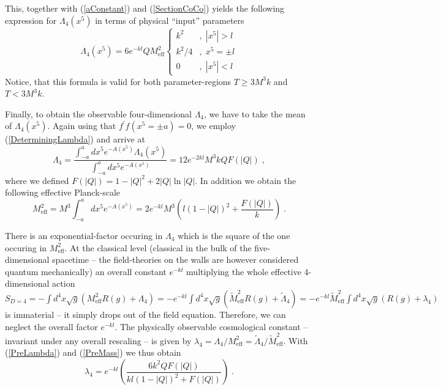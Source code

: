 \documentclass[a4paper,12pt]{article}
\begin{document}
This, together with (\ref{aConstant}) and (\ref{SectionCoCo}) yields
the following expression for $\Lambda_4(x^5)$ in terms of physical
``input'' parameters
\begin{equation}
     \Lambda_4(x^5)
   =  6 e^{-kl} Q M^2_{\text{eff}}
     \left\{ \begin{array}{cc}
                k^2     &,\; |x^5| > l \\
                k^2/4   &,\; x^5 = \pm l \\
                   0        &,\; |x^5| < l
             \end{array}
     \right.
    \label{SectionCoCoFinal}
\end{equation}
Notice, that this formula is valid for both parameter-regions $T \ge 3M^3 k$
and $T < 3M^3 k$.

Finally, to obtain the observable four-dimensional $\Lambda_4$, we
have to take the mean of $\Lambda_4(x^5)$. Again using that $f^\prime
f(x^5=\pm a)=0$, we employ (\ref{DeterminingLambda}) and arrive at
\begin{equation}
  \Lambda_4 = \frac{\int_{-a}^a dx^5 e^{-A(x^5)}\Lambda_4(x^5)}
                    {\int_{-a}^a dx^5 e^{-A(x^5)}}
            = 12e^{-2kl}M^3 k Q F(|Q|) \; ,
  \label{PreLambda}
\end{equation}
where we defined $F(|Q|)=1-|Q|^2+2|Q|\ln|Q|$. In addition we obtain
the following effective Planck-scale
\begin{equation}
  M_{\text{eff}}^2 = M^3 \int_{-a}^a dx^5 e^{-A(x^5)}
                   = 2e^{-kl}M^3\left(l(1-|Q|)^2+\frac{F(|Q|)}{k}\right) 
                      \; .
  \label{PreMass}
\end{equation}

There is an exponential-factor occuring in $\Lambda_4$ which is the
square of the one occuring in $M_{\text{eff}}^2$. At the classical
level (classical in the bulk of the five-dimensional spacetime -- the
field-theories on the walls are however considered quantum
mechanically) an overall constant $e^{-kl}$ multiplying the whole
effective 4-dimensional action $S_{D=4}= -\int
d^4x\sqrt{g}(M^2_{\text{eff}}R(g)+\Lambda_4)= -e^{-kl}\int
d^4x\sqrt{g}({\tilde M}^2_{\text{eff}}R(g)+{\tilde \Lambda}_4)=
-e^{-kl}{\tilde M}^2_{\text{eff}}\int d^4x\sqrt{g}(R(g)+\lambda_4)$ is
immaterial -- it simply drops out of the field equation. Therefore, we
can neglect the overall factor $e^{-kl}$. The physically observable
cosmological constant -- invariant under any overall rescaling -- is
given by $\lambda_4=\Lambda_4/M^2_{\text{eff}}= {\tilde
\Lambda_4}/{\tilde M}^2_{\text{eff}}$. With (\ref{PreLambda}) and 
(\ref{PreMass}) we thus obtain
\begin{equation}
  \lambda_4 = e^{-kl}
              \left( \frac{6k^2 Q F(|Q|)}{kl(1-|Q|)^2 + F(|Q|)}
              \right) \; .
\end{equation}
\end{document}
